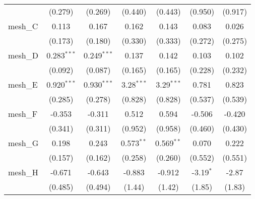 \begin{tabular}{lcccccc}
                                                               & (0.279)        & (0.269)        & (0.440)        & (0.443)        & (0.950)        & (0.917)\\   
   mesh\_C                                                     & 0.113          & 0.167          & 0.162          & 0.143          & 0.083          & 0.026\\   
                                                               & (0.173)        & (0.180)        & (0.330)        & (0.333)        & (0.272)        & (0.275)\\   
   mesh\_D                                                     & 0.283$^{***}$  & 0.249$^{***}$  & 0.137          & 0.142          & 0.103          & 0.102\\   
                                                               & (0.092)        & (0.087)        & (0.165)        & (0.165)        & (0.228)        & (0.232)\\   
   mesh\_E                                                     & 0.920$^{***}$  & 0.930$^{***}$  & 3.28$^{***}$   & 3.29$^{***}$   & 0.781          & 0.823\\   
                                                               & (0.285)        & (0.278)        & (0.828)        & (0.828)        & (0.537)        & (0.539)\\   
   mesh\_F                                                     & -0.353         & -0.311         & 0.512          & 0.594          & -0.506         & -0.420\\   
                                                               & (0.341)        & (0.311)        & (0.952)        & (0.958)        & (0.460)        & (0.430)\\   
   mesh\_G                                                     & 0.198          & 0.243          & 0.573$^{**}$   & 0.569$^{**}$   & 0.070          & 0.222\\   
                                                               & (0.157)        & (0.162)        & (0.258)        & (0.260)        & (0.552)        & (0.551)\\   
   mesh\_H                                                     & -0.671         & -0.643         & -0.883         & -0.912         & -3.19$^{*}$    & -2.87\\   
                                                               & (0.485)        & (0.494)        & (1.44)         & (1.42)         & (1.85)         & (1.83)\\   

\end{tabular}
